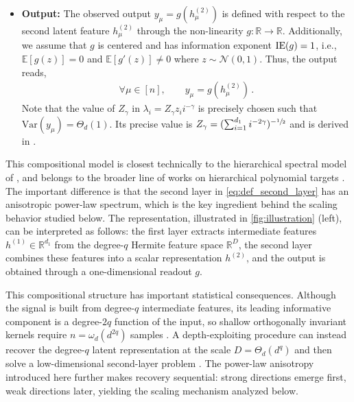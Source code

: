 \documentclass[]{article}
\numberwithin{equation}{section}
\theoremstyle{definition}
\newcommand{\RR}{\mathbb{R}}
\newcommand{\EE}{\mathbb{E}}
\newcommand{\He}{\mathord{\mathrm{He}}}
\begin{document}
\begin{itemize}[noitemsep,leftmargin=1em]
\begin{equation}
        \langle A^{(2)},\He_2(h_\mu^{(1)})\rangle
        =
        \frac{1}{\sqrt{2}}\sum_{i=1}^{d_1}\lambda_i\left((h_{\mu,i}^{(1)})^2-1\right).
        \label{eq:def_second_layer}
    \end{equation}
    \item \textbf{Output:} The observed output $y_\mu = g(h^{(2)}_\mu)$ is defined with respect to the second latent feature $h^{(2)}_\mu$ through the non-linearity $g:\RR \rightarrow \RR$. Additionally, we assume that $g$ is centered and has information exponent ${\rm IE}(g)=1$, i.e., $\EE[g(z)]=0$ and $\EE[g'(z)]\neq0$ where $z\sim\mathcal{N}(0,1)$. Thus, the output reads, 
    \begin{align}
        \forall \mu \in [n],\qquad  y_\mu = g(h_{\mu}^{(2)})\,.
    \end{align}
    Note that the value of $Z_{\gamma}$ in $\lambda_i = Z_{\gamma}z_i i^{-\gamma}$ is precisely chosen such that $\mathrm{Var}(y_\mu)=\Theta_d(1)$. Its precise value is $Z_{\gamma} = (\sum_{i=1}^{d_1} i^{-2\gamma})^{-\sfrac{1}{2}}$ and is derived in . 
\end{itemize}
This compositional model is closest technically to the hierarchical spectral model of \citep{tabanelli2026deep}, and belongs to the broader line of works on hierarchical polynomial targets \citep{wang2023learning,nichani2024provable,fu2025learning}. The important difference is that the second layer in \cref{eq:def_second_layer} has an anisotropic power-law spectrum, which is the key ingredient behind the scaling behavior studied below. The representation, illustrated in \cref{fig:illustration} (left), can be interpreted as follows: the first layer extracts intermediate features $h^{(1)}\in\mathbb R^{d_1}$ from the degree-$q$ Hermite feature space $\mathbb R^D$, the second layer combines these features into a scalar representation $h^{(2)}$, and the output is obtained through a one-dimensional readout $g$.

This compositional structure has important statistical consequences. Although the signal is built from degree-$q$ intermediate features, its leading informative component is a degree-$2q$ function of the input, so shallow orthogonally invariant kernels require $n=\omega_d(d^{2q})$ samples \citep{mei2022generalization}. A depth-exploiting procedure can instead recover the degree-$q$ latent representation at the scale $D=\Theta_d(d^q)$ and then solve a low-dimensional second-layer problem \citep{tabanelli2026deep}. The power-law anisotropy introduced here further makes recovery sequential: strong directions emerge first, weak directions later, yielding the scaling mechanism analyzed below.
\end{document}
